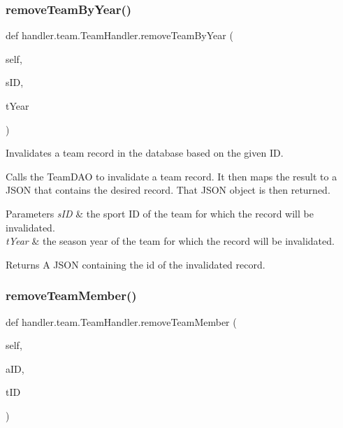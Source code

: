 \subsubsection{\texorpdfstring{remove\+Team\+By\+Year()}{removeTeamByYear()}}
{\footnotesize\ttfamily def handler.\+team.\+Team\+Handler.\+remove\+Team\+By\+Year (\begin{DoxyParamCaption}\item[{}]{self,  }\item[{}]{s\+ID,  }\item[{}]{t\+Year }\end{DoxyParamCaption})}



Invalidates a team record in the database based on the given ID. 

Calls the Team\+D\+AO to invalidate a team record. It then maps the result to a J\+S\+ON that contains the desired record. That J\+S\+ON object is then returned.


\begin{DoxyParams}{Parameters}
{\em s\+ID} & the sport ID of the team for which the record will be invalidated. \\
\hline
{\em t\+Year} & the season year of the team for which the record will be invalidated.\\
\hline
\end{DoxyParams}
\begin{DoxyReturn}{Returns}
A J\+S\+ON containing the id of the invalidated record. 
\end{DoxyReturn}
\mbox{\label{classhandler_1_1team_1_1_team_handler_aac0d812b5de7f390f36d12590429df95}} 
\subsubsection{\texorpdfstring{remove\+Team\+Member()}{removeTeamMember()}}
{\footnotesize\ttfamily def handler.\+team.\+Team\+Handler.\+remove\+Team\+Member (\begin{DoxyParamCaption}\item[{}]{self,  }\item[{}]{a\+ID,  }\item[{}]{t\+ID }\end{DoxyParamCaption})}



